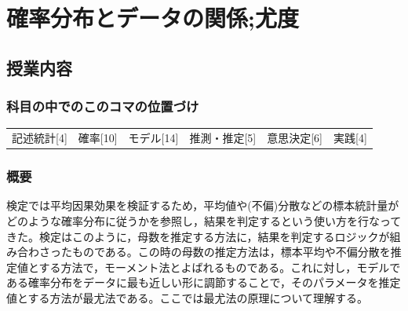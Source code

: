 \section{確率分布とデータの関係;尤度}
\label{D1_lesson23}

\subsection{授業内容}
\subsubsection{科目の中でのこのコマの位置づけ}
\begin{tabular}[t]{cccccc}
    記述統計[4] & 確率[10] & モデル[14] & 推測・推定[5] & 意思決定[6] & 実践[4]
\end{tabular}

\subsubsection{概要}
検定では平均因果効果を検証するため，平均値や(不偏)分散などの標本統計量がどのような確率分布に従うかを参照し，結果を判定するという使い方を行なってきた。検定はこのように，母数を推定する方法に，結果を判定するロジックが組み合わさったものである。この時の母数の推定方法は，標本平均や不偏分散を推定値とする方法で，モーメント法とよばれるものである。これに対し，モデルである確率分布をデータに最も近しい形に調節することで，そのパラメータを推定値とする方法が最尤法である。ここでは最尤法の原理について理解する。
